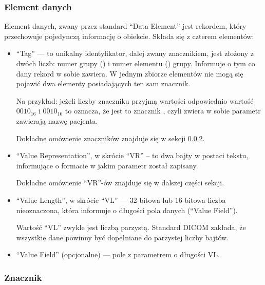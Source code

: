 \subsubsection{Element danych}

Element danych, zwany przez standard \DICOM \enquote{Data Element} jest rekordem, który przechowuje pojedynczą informację o obiekcie.
Składa się z czterem elementów:

\begin{itemize}

    \item \enquote{Tag} --- to unikalny identyfikator, dalej zwany znacznikiem, jest złożony z dwóch liczb: numer grupy () i numer elementu () grupy.
          Informuje o tym co dany rekord w sobie zawiera.
          W jednym zbiorze elementów nie mogą się pojawić dwa elementy posiadających ten sam znacznik.

          Na przykład: jeżeli liczby znaczniku przyjmą wartości odpowiednio wartość $0010_{16}$ i $0010_{16}$ to oznacza, że jest to znacznik , czyli zwiera w sobie parametr zawierają nazwę pacjenta.

          Dokładne omówienie znaczników znajduje się w sekcji \ref{sec:dicom-tag}.

    \item \enquote{Value Representation}, w skrócie \enquote{VR} – to dwa bajty w postaci tekstu, informujące o formacie w jakim parametr został zapisany.

          Dokładne omówienie \enquote{VR}-ów znajduje się w dalszej części sekcji.

    \item \enquote{Value Length}, w skrócie \enquote{VL} --- 32-bitowa lub 16-bitowa liczba nieoznaczona, która informuje o długości pola danych (\enquote{Value Field}).

          Wartość \enquote{VL} zwykle jest liczbą parzystą.
          Standard DICOM zakłada, że wszystkie dane powinny być dopełniane do parzystej liczby bajtów.

    \item \enquote{Value Field} (opcjonalne) --- pole z parametrem o długości VL.

\end{itemize}

\subsubsection{Znacznik}
\label{sec:dicom-tag}

